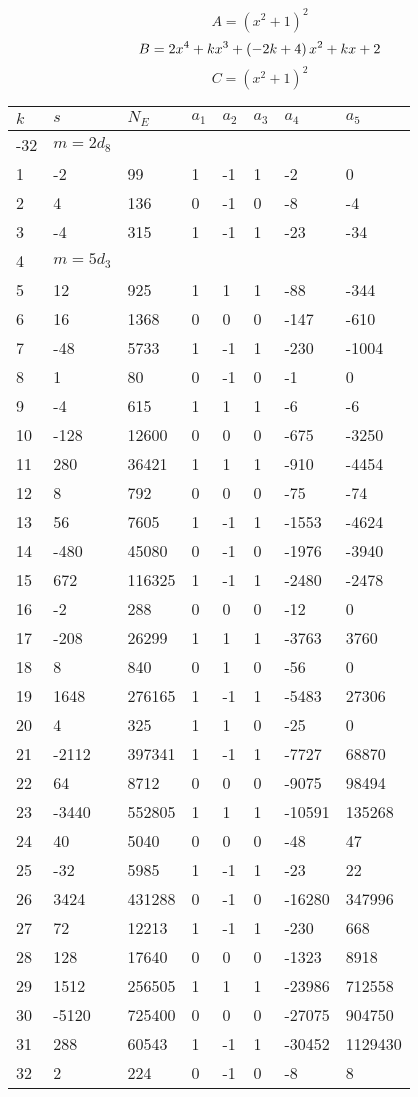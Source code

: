 \documentclass{amsart}
\begin{document}
$$A=(x^2
 + 1)^{2}$$
$$B=2\*x^4
 + k\*x^3
 + \left(-2\*k
 + 4\right) \*x^2
 + k\*x
 + 2$$
$$C=(x^2
 + 1)^{2}$$
\begin{longtable}{|l|l|l|lllll|}
\hline
$k$ & $s$ & $N_E$ & $a_1$ & $a_2$ & $a_3$ & $a_4$ & $a_5$\\
\hline
-32&$m=2d_{8}$&&\multicolumn{5}{c|}{}\\
1&-2&99&1&-1&1&-2&0\\
2&4&136&0&-1&0&-8&-4\\
3&-4&315&1&-1&1&-23&-34\\
4&$m=5d_{3}$&&\multicolumn{5}{c|}{}\\
5&12&925&1&1&1&-88&-344\\
6&16&1368&0&0&0&-147&-610\\
7&-48&5733&1&-1&1&-230&-1004\\
8&1&80&0&-1&0&-1&0\\
9&-4&615&1&1&1&-6&-6\\
10&-128&12600&0&0&0&-675&-3250\\
11&280&36421&1&1&1&-910&-4454\\
12&8&792&0&0&0&-75&-74\\
13&56&7605&1&-1&1&-1553&-4624\\
14&-480&45080&0&-1&0&-1976&-3940\\
15&672&116325&1&-1&1&-2480&-2478\\
16&-2&288&0&0&0&-12&0\\
17&-208&26299&1&1&1&-3763&3760\\
18&8&840&0&1&0&-56&0\\
19&1648&276165&1&-1&1&-5483&27306\\
20&4&325&1&1&0&-25&0\\
21&-2112&397341&1&-1&1&-7727&68870\\
22&64&8712&0&0&0&-9075&98494\\
23&-3440&552805&1&1&1&-10591&135268\\
24&40&5040&0&0&0&-48&47\\
25&-32&5985&1&-1&1&-23&22\\
26&3424&431288&0&-1&0&-16280&347996\\
27&72&12213&1&-1&1&-230&668\\
28&128&17640&0&0&0&-1323&8918\\
29&1512&256505&1&1&1&-23986&712558\\
30&-5120&725400&0&0&0&-27075&904750\\
31&288&60543&1&-1&1&-30452&1129430\\
32&2&224&0&-1&0&-8&8\\

\end{longtable}
\end{document}
